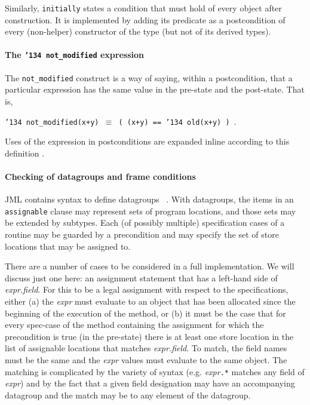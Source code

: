 \documentclass{article}
\begin{document}
Similarly, \texttt{initially} states a condition that must hold of every object after construction.  It is implemented by adding its predicate as a postcondition of every (non-helper) constructor of the type (but not 
of its derived types).

\paragraph*{The \texttt{\char'134 not\_modified} expression}
The \texttt{not\_modified} construct is a way of saying, within a postcondition, that a particular 
expression has the same value in the pre-state and the post-state.  That is,
\begin{center}
\texttt{\char'134 not\_modified(x+y) $\equiv$ ( (x+y) == \char'134 old(x+y) )  }.
\end{center}
Uses of the expression in postconditions are expanded inline according to this definition .

\paragraph*{Checking of datagroups and frame conditions}
JML contains syntax to define datagroups ~\cite{Leino-Poetzsch-Heffter-Zhou02}.  With datagroups,
the items in an \texttt{assignable} clause may represent sets of program locations,
and those sets may be extended by subtypes.
 Each (of possibly multiple) specification cases of a routine may be guarded by a precondition and may specify the
set of store locations that may be assigned to. 

There are a number of cases to be considered in a full implementation.  We will discuss
just one here: an assignment statement that has a left-hand side of \textit{expr.field}.
For this to be a legal assignment with respect to the specifications, either (a) the 
\textit{expr} must evaluate to an object that has been allocated since the beginning of
the execution of the method, or (b) it must be the
case that for every spec-case of the method containing the assignment
for which the precondition is true (in the pre-state) there is at least one store location
in the list of assignable locations that matches \textit{expr.field}.  To match, the
field names must be the same and the \textit{expr} values must evaluate to the same
object.  The matching is complicated by the variety of syntax (e.g. \textit{expr}\texttt{.*}
matches any field of \textit{expr}) and by the fact that a given field designation may
have an accompanying datagroup and the match may be to any element of the datagroup.
\end{document}
